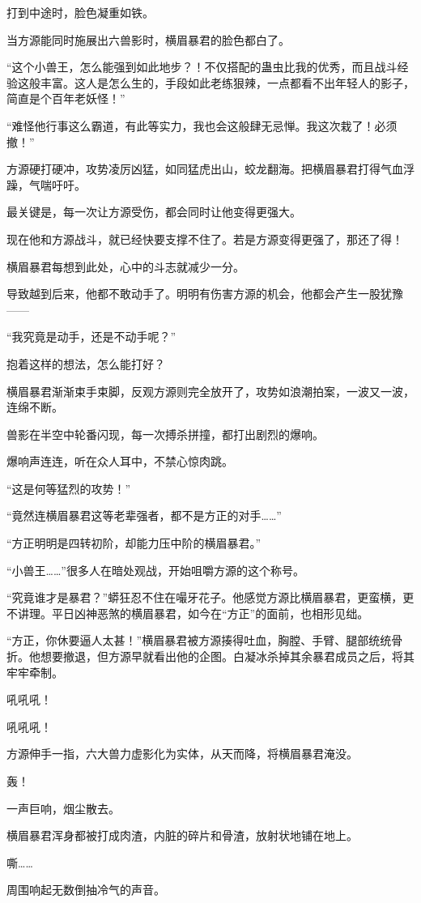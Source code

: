 \begin{this_body}
打到中途时，脸色凝重如铁。

当方源能同时施展出六兽影时，横眉暴君的脸色都白了。

“这个小兽王，怎么能强到如此地步？！不仅搭配的蛊虫比我的优秀，而且战斗经验这般丰富。这人是怎么生的，手段如此老练狠辣，一点都看不出年轻人的影子，简直是个百年老妖怪！”

“难怪他行事这么霸道，有此等实力，我也会这般肆无忌惮。我这次栽了！必须撤！”

方源硬打硬冲，攻势凌厉凶猛，如同猛虎出山，蛟龙翻海。把横眉暴君打得气血浮躁，气喘吁吁。

最关键是，每一次让方源受伤，都会同时让他变得更强大。

现在他和方源战斗，就已经快要支撑不住了。若是方源变得更强了，那还了得！

横眉暴君每想到此处，心中的斗志就减少一分。

导致越到后来，他都不敢动手了。明明有伤害方源的机会，他都会产生一股犹豫——

“我究竟是动手，还是不动手呢？”

抱着这样的想法，怎么能打好？

横眉暴君渐渐束手束脚，反观方源则完全放开了，攻势如浪潮拍案，一波又一波，连绵不断。

兽影在半空中轮番闪现，每一次搏杀拼撞，都打出剧烈的爆响。

爆响声连连，听在众人耳中，不禁心惊肉跳。

“这是何等猛烈的攻势！”

“竟然连横眉暴君这等老辈强者，都不是方正的对手……”

“方正明明是四转初阶，却能力压中阶的横眉暴君。”

“小兽王……”很多人在暗处观战，开始咀嚼方源的这个称号。

“究竟谁才是暴君？”蟒狂忍不住在嘬牙花子。他感觉方源比横眉暴君，更蛮横，更不讲理。平日凶神恶煞的横眉暴君，如今在“方正”的面前，也相形见绌。

“方正，你休要逼人太甚！”横眉暴君被方源揍得吐血，胸膛、手臂、腿部统统骨折。他想要撤退，但方源早就看出他的企图。白凝冰杀掉其余暴君成员之后，将其牢牢牵制。

吼吼吼！

吼吼吼！

方源伸手一指，六大兽力虚影化为实体，从天而降，将横眉暴君淹没。

轰！

一声巨响，烟尘散去。

横眉暴君浑身都被打成肉渣，内脏的碎片和骨渣，放射状地铺在地上。

嘶……

周围响起无数倒抽冷气的声音。

\end{this_body}

